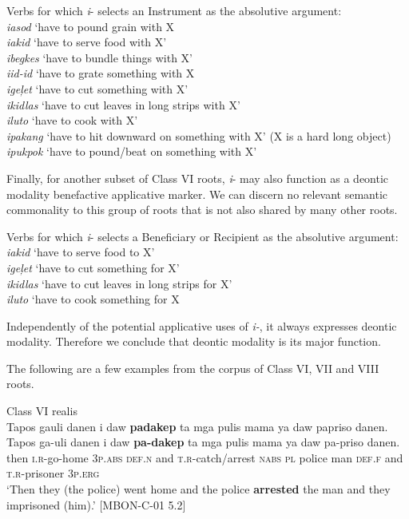 \ea
\label{bkm:Ref148965668}Verbs for which \textit{i}{}- selects an Instrument as the absolutive argument: \\
\textit{iasod}   ‘have to pound grain with X \\
\textit{iakid}   ‘have to serve food with X’ \\
\textit{ibegkes}   ‘have to bundle things with X’ \\
\textit{iid-id}   ‘have to grate something with X \\
\textit{igeļet}   ‘have to cut something with X’ \\
\textit{ikidlas}   ‘have to cut leaves in long strips with X’ \\
\textit{iluto}   ‘have to cook with X’ \\
\textit{ipakang}   ‘have to hit downward on something with X’ (X is a hard long     object) \\
\textit{ipukpok}   ‘have to pound/beat on something with X’
\z

Finally, for another subset of Class VI roots, \textit{i}{}- may also function as a deontic modality benefactive applicative marker. We can discern no relevant semantic commonality to this group of roots that is not also shared by many other roots.

\ea
Verbs for which \textit{i}{}- selects a Beneficiary or Recipient as the absolutive argument: \\
\textit{iakid}   ‘have to serve food to X’ \\
\textit{igeļet}   ‘have to cut something for X’ \\
\textit{ikidlas}   ‘have to cut leaves in long strips for X’ \\
\textit{iluto}   ‘have to cook something for X
\z

Independently of the potential applicative uses of \textit{i-}, it always expresses deontic modality. Therefore we conclude that deontic modality is its major function. 

The following are a few examples from the corpus of Class VI, VII and VIII roots.

\ea
Class VI realis \\
Tapos  gauli  danen  i  daw  \textbf{padakep}  ta  mga  pulis mama  ya  daw  papriso  danen. \\\smallskip
\gll Tapos  ga-uli  danen  i  daw  \textbf{pa-dakep}  ta  mga  pulis mama  ya  daw  pa-priso  danen. \\
then  \textsc{i.r}-go-home  3\textsc{p.abs}  \textsc{def.n}  and  \textsc{t.r}-catch/arrest  \textsc{nabs}  \textsc{pl}  police
man  \textsc{def.f}  and  \textsc{t.r}-prisoner  3\textsc{p.erg} \\
\glt ‘Then they (the police) went home and the police \textbf{arrested} the man and they imprisoned (him).' [MBON-C-01 5.2]
\z

